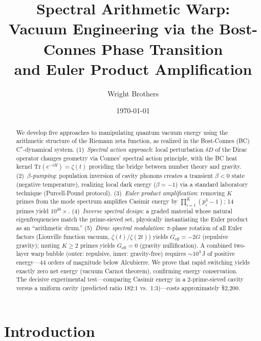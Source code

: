 \documentclass[aps,prd,twocolumn,superscriptaddress,nofootinbib]{revtex4-2}
\newcommand{\Tr}{\mathrm{Tr}}
\begin{document}
\title{Spectral Arithmetic Warp:\\
Vacuum Engineering via the Bost-Connes Phase Transition\\
and Euler Product Amplification}

\author{Wright Brothers}
\date{\today}

\begin{abstract}
We develop five approaches to manipulating quantum vacuum energy
using the arithmetic structure of the Riemann zeta function,
as realized in the Bost-Connes (BC) C$^*$-dynamical system.
(1)~\emph{Spectral action approach}: local perturbation $\delta D$ of the
Dirac operator changes geometry via Connes' spectral action principle,
with the BC heat kernel $\Tr(e^{-tH}) = \zeta(t)$ providing the bridge
between number theory and gravity.
(2)~\emph{$\beta$-pumping}: population inversion of cavity phonons
creates a transient $\beta < 0$ state (negative temperature),
realizing local dark energy ($\beta = -1$) via a standard laboratory
technique (Purcell-Pound protocol).
(3)~\emph{Euler product amplification}: removing $K$ primes from the
mode spectrum amplifies Casimir energy by $\prod_{i=1}^K (p_i^3 - 1)$;
14 primes yield $10^{48}\times$.
(4)~\emph{Inverse spectral design}: a graded material whose natural
eigenfrequencies match the prime-sieved set, physically instantiating
the Euler product as an ``arithmetic drum.''
(5)~\emph{Dirac spectral modulation}: $\pi$-phase rotation of all
Euler factors (Liouville function vacuum, $\zeta(t)/\zeta(2t)$)
yields $G_{\mathrm{eff}} = -2G$ (repulsive gravity); muting $K \geq 2$
primes yields $G_{\mathrm{eff}} = 0$ (gravity nullification).
A combined two-layer warp bubble (outer: repulsive, inner: gravity-free)
requires $\sim 10^3$\,J of positive energy---44 orders of magnitude
below Alcubierre.
We prove that rapid switching yields exactly zero net energy
(vacuum Carnot theorem), confirming energy conservation.
The decisive experimental test---comparing Casimir energy in a
2-prime-sieved cavity versus a uniform cavity (predicted ratio 182:1
vs.\ 1:3)---costs approximately \$2{,}200.
\end{abstract}

\maketitle

\section{Introduction}
\end{document}
